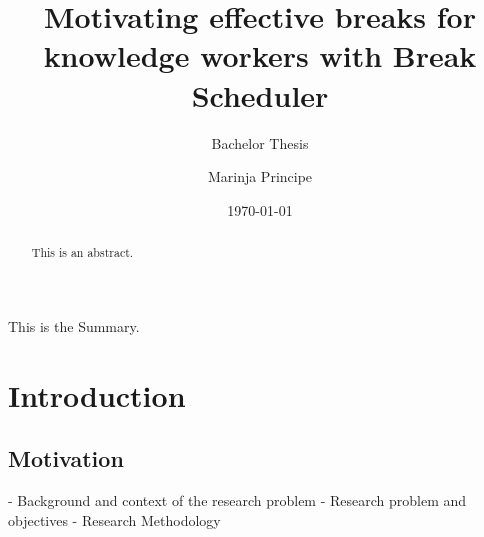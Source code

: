 \documentclass{hasel_thesis}
\date{\today}
\title{Motivating effective breaks for knowledge workers with Break  Scheduler }
\subtitle{Bachelor Thesis}
\author{Marinja Principe}
\begin{document}
\maketitle

\frontmatter

\begin{acknowledgements}
\end{acknowledgements}

\begin{abstract}
This is an abstract.
\end{abstract}

\begin{Summary}
This is the Summary.
\end{Summary}
    

\tableofcontents
\listoffigures
\listoftables
\lstlistoflistings

\mainmatter
\chapter{Introduction}



\section{Motivation}
- Background and context of the research problem
- Research problem and objectives
- Research Methodology
\end{document}
